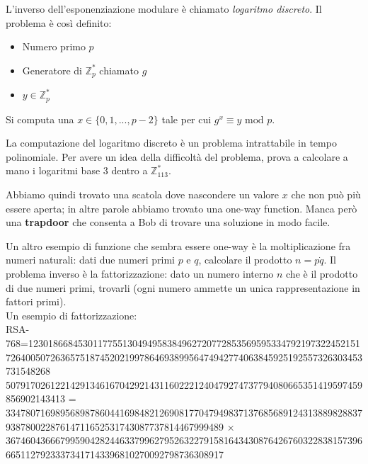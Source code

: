 \medskip

	\begin{algorithmic}
	\EndIf
	\EndFor
	\end{algorithmic}

\medskip

L'inverso dell'esponenziazione modulare è chiamato \textit{logaritmo discreto}.
Il problema è così definito:
\begin{itemize}
	\item Numero primo $p$
	\item Generatore di $\mathbb{Z}_p^*$ chiamato $g$
	\item $y \in \mathbb{Z}_p^*$
\end{itemize}
Si computa una $x \in \{0, 1, ..., p-2\}$ tale per cui $g^x \equiv y \text{ mod } p$.

La computazione del logaritmo discreto è un problema intrattabile in tempo polinomiale. Per avere un idea della difficoltà del problema, prova a calcolare a mano i logaritmi base 3 dentro a $\mathbb{Z}_{113}^*$.

Abbiamo quindi trovato una scatola dove nascondere un valore $x$ che non può più essere aperta; in altre parole abbiamo trovato una one-way function. Manca però una \textbf{trapdoor} che consenta a Bob di trovare una soluzione in modo facile.

Un altro esempio di funzione che sembra essere one-way è la moltiplicazione fra numeri naturali: dati due numeri primi $p$ e $q$, calcolare il prodotto $n = p \dot q$.
Il problema inverso è la fattorizzazione: dato un numero interno $n$ che è il prodotto di due numeri primi, trovarli (ogni numero ammette un unica rappresentazione in fattori primi).\\



Un esempio di fattorizzazione:\\



RSA-768=1230186684530117755130494958384962720772853569595334792197322452151726400507263657518745202199786469389956474942774063845925192557326303453731548268
507917026122142913461670429214311602221240479274737794080665351419597459856902143413 = 33478071698956898786044169848212690817704794983713768568912431388982883793878002287614711652531743087737814467999489 × 36746043666799590428244633799627952632279158164343087642676032283815739666511279233373417143396810270092798736308917


